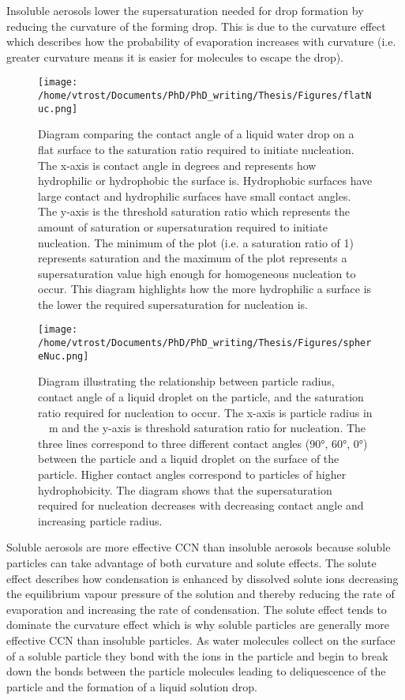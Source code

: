 Insoluble aerosols lower the supersaturation needed for drop formation by reducing the curvature of the forming drop. This is due to the curvature effect which describes how the probability of evaporation increases with curvature (i.e. greater curvature means it is easier for molecules to escape the drop). \citep{rog1989, lamb2011,bouc2015}

\begin{figure}[H]
	\centering
	\texttt{[image: /home/vtrost/Documents/PhD/PhD\_writing/Thesis/Figures/flatNuc.png]}
	\caption{Diagram comparing the contact angle of a liquid water drop on a flat surface to the saturation ratio required to initiate nucleation. The x-axis is contact angle in degrees and represents how hydrophilic or hydrophobic the surface is. Hydrophobic surfaces have large contact and hydrophilic surfaces have small contact angles. The y-axis is the threshold saturation ratio which represents the amount of saturation or supersaturation required to initiate nucleation. The minimum of the plot (i.e. a saturation ratio of 1) represents saturation and the maximum of the plot represents a supersaturation value high enough for homogeneous nucleation to occur. This diagram highlights how the more hydrophilic a surface is the lower the required supersaturation for nucleation is. \citep[][Figure 7.9]{lamb2011}}
	\label{fig:flatNuc}
\end{figure}

\begin{figure}[H]
	\centering
	\texttt{[image: /home/vtrost/Documents/PhD/PhD\_writing/Thesis/Figures/sphereNuc.png]}
	\caption{Diagram illustrating the relationship between particle radius, contact angle of a liquid droplet on the particle, and the saturation ratio required for nucleation to occur. The x-axis is particle radius in \SI{}{\mu m} and the y-axis is threshold saturation ratio for nucleation. The three lines correspond to three different contact angles (\ang{90}, \ang{60}, \ang{0})  between the particle and a liquid droplet on the surface of the particle. Higher contact angles correspond to particles of higher hydrophobicity. The diagram shows that the supersaturation required for nucleation decreases with decreasing contact angle and increasing particle radius. \citep[][Figure 7.10]{lamb2011}}
	\label{fig:sphereNuc}
\end{figure}

Soluble aerosols are more effective CCN than insoluble aerosols because soluble particles can take advantage of both curvature and solute effects. The solute effect describes how condensation is enhanced by dissolved solute ions decreasing the equilibrium vapour pressure of the solution and thereby reducing the rate of evaporation and increasing the rate of condensation. The solute effect tends to dominate the curvature effect which is why soluble particles are generally more effective CCN than insoluble particles. As water molecules collect on the surface of a soluble particle they bond with the ions in the particle and begin to break down the bonds between the particle molecules leading to deliquescence of the particle and the formation of a liquid solution drop. \citep{rog1989,lamb2011,bouc2015}

